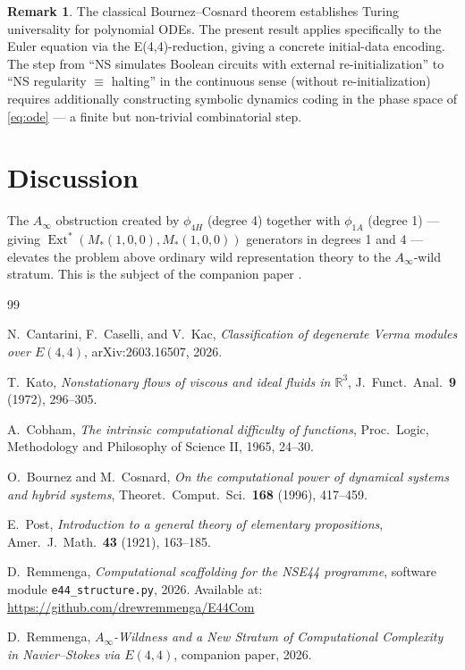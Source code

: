 \documentclass[reqno,10pt]{amsart}
\theoremstyle{plain}
\theoremstyle{definition}
\newtheorem{remark}[theorem]{Remark}
\def\Ext{\operatorname{Ext}}
\begin{document}
\begin{remark}
  The classical Bournez--Cosnard theorem \cite{BC1996} establishes Turing
  universality for polynomial ODEs.  The present result applies specifically
  to the Euler equation via the E(4,4)-reduction, giving a concrete
  initial-data encoding.  The step from ``NS simulates Boolean circuits with
  external re-initialization'' to ``NS regularity $\equiv$ halting'' in the
  continuous sense (without re-initialization) requires additionally
  constructing symbolic dynamics coding in the phase space of \eqref{eq:ode}
  — a finite but non-trivial combinatorial step.
\end{remark}

\section{Discussion}\label{sec:discussion}

The $A_\infty$ obstruction created by $\phi_{4H}$ (degree 4) together with
$\phi_{1A}$ (degree 1) — giving $\Ext^*(M_*(1,0,0),M_*(1,0,0))$ generators
in degrees 1 and 4 — elevates the problem above ordinary wild representation
theory to the $A_\infty$-wild stratum.  This is the subject of the companion
paper \cite{Paper2}.

\begin{thebibliography}{99}

N.~Cantarini, F.~Caselli, and V.~Kac,
\emph{Classification of degenerate Verma modules over $E(4,4)$},
arXiv:2603.16507, 2026.

T.~Kato,
\emph{Nonstationary flows of viscous and ideal fluids in $\mathbb{R}^3$},
J.\ Funct.\ Anal.\ \textbf{9} (1972), 296--305.

A.~Cobham,
\emph{The intrinsic computational difficulty of functions},
Proc.\ Logic, Methodology and Philosophy of Science II, 1965, 24--30.

O.~Bournez and M.~Cosnard,
\emph{On the computational power of dynamical systems and hybrid systems},
Theoret.\ Comput.\ Sci.\ \textbf{168} (1996), 417--459.

E.~Post,
\emph{Introduction to a general theory of elementary propositions},
Amer.\ J.\ Math.\ \textbf{43} (1921), 163--185.

D.~Remmenga,
\emph{Computational scaffolding for the NSE44 programme},
software module \texttt{e44\_structure.py}, 2026.
Available at: \url{https://github.com/drewremmenga/E44Com}

D.~Remmenga,
\emph{$A_\infty$-Wildness and a New Stratum of Computational Complexity
in Navier--Stokes via $E(4,4)$},
companion paper, 2026.

\end{thebibliography}
\end{document}
